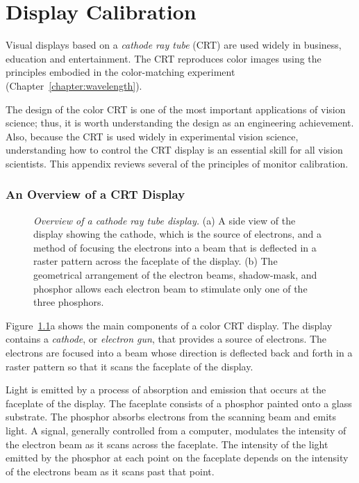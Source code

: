 \chapter{Display Calibration}
\label{chapter:displayCalibration}
Visual displays based on a {\em cathode ray tube} (CRT) are used
widely in business, education and entertainment.  The CRT reproduces
color images using the principles embodied in the color-matching
experiment (Chapter~\ref{chapter:wavelength}).

The design of the color CRT is one of the most important applications
of vision science; thus, it is worth understanding the design as an
engineering achievement.  Also, because the CRT is used widely in
experimental vision science, understanding how to control the CRT
display is an essential skill for all vision scientists.  This
appendix reviews several of the principles of monitor calibration.

\subsection*{An Overview of a CRT Display}
\begin{figure}
\centerline {
}
\caption[Television Display]{
{\em Overview of a cathode ray tube display.}  (a) A side view of the
display showing the cathode, which is the source of electrons, and a
method of focusing the electrons into a beam that is deflected in a
raster pattern across the faceplate of the display.  (b) The
geometrical arrangement of the electron beams, shadow-mask, and
phosphor allows each electron beam to stimulate only one of the three
phosphors.
}
\label{fa2:tv}
\end{figure}
Figure~\ref{fa2:tv}a shows the main components of a color CRT display.
The display contains a {\em cathode}, or {\em electron gun}, that
provides a source of electrons.  The electrons are focused into a beam
whose direction is deflected back and forth in a raster pattern so
that it scans the faceplate of the display.

Light is emitted by a process of absorption and emission that occurs
at the faceplate of the display.  The faceplate consists of a phosphor
painted onto a glass substrate.  The phosphor absorbs electrons from
the scanning beam and emits light.  A signal, generally controlled
from a computer, modulates the intensity of the electron beam as it
scans across the faceplate.  The intensity of the light emitted by
the phosphor at each point on the faceplate depends on the intensity of
the electrons beam as it scans past that point.

